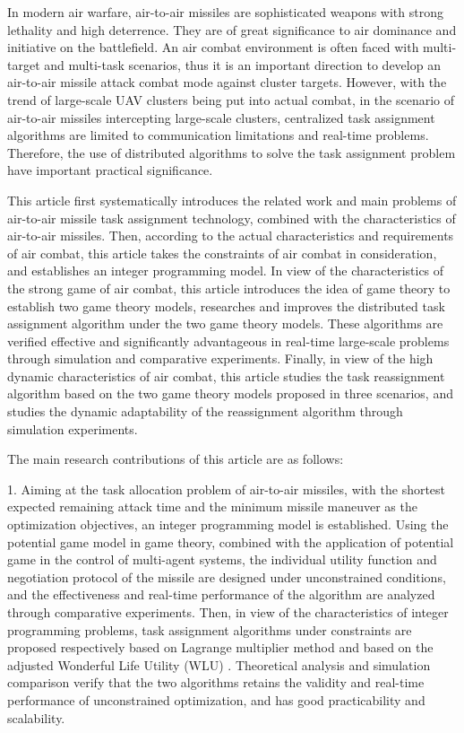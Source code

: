\begin{abstract*}
In modern air warfare, air-to-air missiles are sophisticated weapons with strong lethality and high deterrence. They are of great significance to air dominance and initiative on the battlefield. An air combat environment is often faced with multi-target and multi-task scenarios, thus it is an important direction to develop an air-to-air missile attack combat mode against cluster targets. However, with the trend of large-scale UAV clusters being put into actual combat, in the scenario of air-to-air missiles intercepting large-scale clusters, centralized task assignment algorithms are limited to communication limitations and real-time problems. Therefore, the use of distributed algorithms to solve the task assignment problem have important practical significance.
  
  This article first systematically introduces the related work and main problems of air-to-air missile task assignment technology,  combined with the characteristics of air-to-air missiles. Then, according to the actual characteristics and requirements of air combat, this article takes the constraints of air combat in consideration, and establishes an integer programming model. In view of the characteristics of the strong game of air combat, this article introduces the idea of ​​game theory to establish two game theory models, researches and improves the distributed task assignment algorithm under the two game theory models. These algorithms are verified effective and significantly advantageous in real-time large-scale problems through simulation and comparative experiments. Finally, in view of the high dynamic characteristics of air combat, this article studies the task reassignment algorithm based on the two game theory models proposed in three scenarios, and studies the dynamic adaptability of the reassignment algorithm through simulation experiments.
  
  The main research contributions of this article are as follows:
  
  1. Aiming at the task allocation problem of air-to-air missiles, with the shortest expected remaining attack time and the minimum missile maneuver as the optimization objectives, an integer programming model is established. Using the potential game model in game theory, combined with the application of potential game in the control of multi-agent systems, the individual utility function and negotiation protocol of the missile are designed under unconstrained conditions, and the effectiveness and real-time performance of the algorithm are analyzed through comparative experiments. Then, in view of the characteristics of integer programming problems, task assignment algorithms under constraints are proposed respectively based on Lagrange multiplier method and based on the adjusted Wonderful Life Utility (WLU) . Theoretical analysis and simulation comparison verify that the two algorithms retains the validity and real-time performance of unconstrained optimization, and has good practicability and scalability.
  

\end{abstract*}
